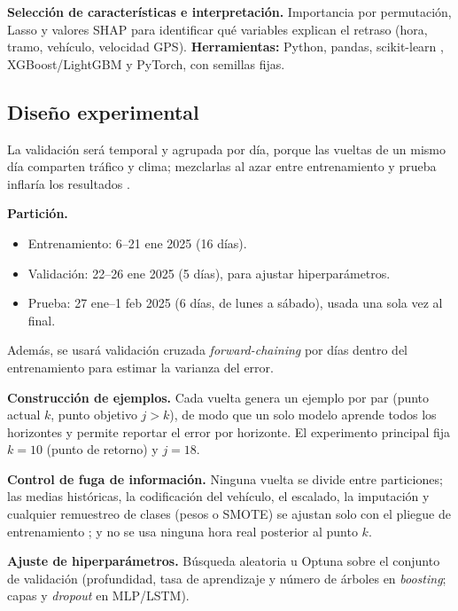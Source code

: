 \documentclass[conference,spanish]{IEEEtran}
\begin{document}
\textbf{Selección de características e interpretación.} Importancia por permutación, Lasso y valores SHAP \cite{lundberg2017} para identificar qué variables explican el retraso (hora, tramo, vehículo, velocidad GPS). \textbf{Herramientas:} Python, pandas, scikit-learn \cite{pedregosa2011}, XGBoost/LightGBM y PyTorch, con semillas fijas.

\subsection{Diseño experimental}
La validación será temporal y agrupada por día, porque las vueltas de un mismo día comparten tráfico y clima; mezclarlas al azar entre entrenamiento y prueba inflaría los resultados \cite{martyanov2026,boudabbous2026,bergmeir2012}.

\textbf{Partición.}
\begin{itemize}
    \item Entrenamiento: 6--21 ene 2025 (16 días).
    \item Validación: 22--26 ene 2025 (5 días), para ajustar hiperparámetros.
    \item Prueba: 27 ene--1 feb 2025 (6 días, de lunes a sábado), usada una sola vez al final.
\end{itemize}
Además, se usará validación cruzada \textit{forward-chaining} por días dentro del entrenamiento para estimar la varianza del error.

\textbf{Construcción de ejemplos.} Cada vuelta genera un ejemplo por par (punto actual $k$, punto objetivo $j>k$), de modo que un solo modelo aprende todos los horizontes y permite reportar el error por horizonte. El experimento principal fija $k=10$ (punto de retorno) y $j=18$.

\textbf{Control de fuga de información.} Ninguna vuelta se divide entre particiones; las medias históricas, la codificación del vehículo, el escalado, la imputación y cualquier remuestreo de clases (pesos o SMOTE) se ajustan solo con el pliegue de entrenamiento \cite{kaufman2012}; y no se usa ninguna hora real posterior al punto $k$.

\textbf{Ajuste de hiperparámetros.} Búsqueda aleatoria u Optuna sobre el conjunto de validación (profundidad, tasa de aprendizaje y número de árboles en \textit{boosting}; capas y \textit{dropout} en MLP/LSTM).
\end{document}
